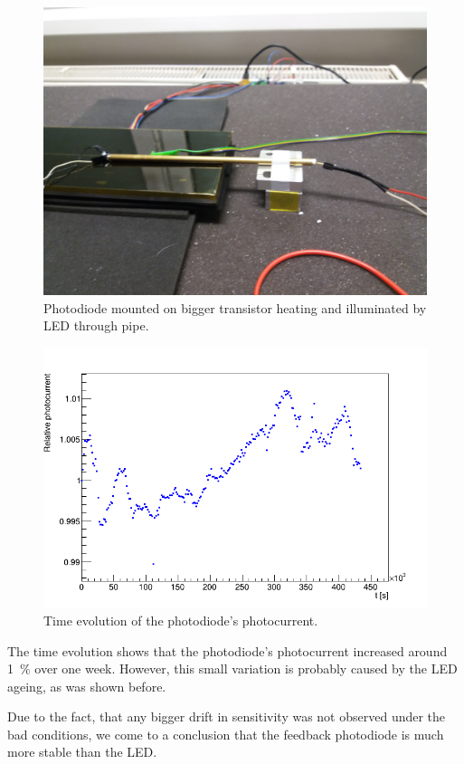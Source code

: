 \begin{figure}[H]
 \centering
 \includegraphics[scale=0.08, angle=180]{./pictures/TempDestrc}
 \caption{Photodiode mounted on bigger transistor heating and illuminated by LED through pipe.}
 \label{aging}
\end{figure}


\begin{figure}[H]
 \centering
 \includegraphics[scale=0.6]{./pictures/ArtiAging}
 \caption{Time evolution of the photodiode's photocurrent.}
 \label{agingPhotoCurrent}
\end{figure}

The time evolution shows that the photodiode's photocurrent increased around 1~$\%$ over one week. However, this small variation is probably caused by the LED ageing, as was shown before. 
\par
Due to the fact, that any bigger drift in sensitivity was not observed under the bad conditions, we come to a conclusion that the feedback photodiode is much more stable than the LED.


